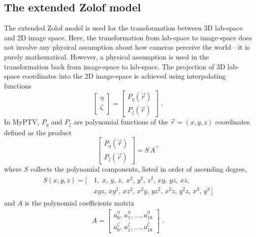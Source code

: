 \documentclass[10pt,a4paper]{article}
\begin{document}
\subsection{The extended Zolof model}
The extended Zolof model is used for the transformation between 3D lab-space and 2D image space.
Here, the transformation from lab-space to image-space does not involve any physical assumption about how cameras perceive the world---it is purely mathematical. However, a physical assumption is used in the transformation back from image-space to lab-space.
The projection of 3D lab-space coordinates into the 2D image-space is achieved using interpolating functions
%
\begin{equation}
	\left[
	\begin{matrix}
		\eta \\[.2cm]
		\zeta
	\end{matrix}
	\right]
	=
	\left[
	\begin{matrix}
		P_\eta(\vec{r}) \\[.2cm]
		P_\zeta(\vec{r})
	\end{matrix}
	\right]\,\, .
\end{equation}
%
In MyPTV, $P_\eta$ and $P_\zeta$ are polynomial functions of the $\vec{r}=(x,y,z)$ coordinates defined as the product
\begin{equation}
	\left[
	\begin{matrix}
		P_\eta(\vec{r}) \\[.2cm]
		P_\zeta(\vec{r})
	\end{matrix}
	\right] = S \, A^{\top}
\end{equation}
where $S$ collects the polynomial components, listed in order of ascending degree,
%
\begin{align}
	\label{eq:SoloffVector}
	\begin{split}
		S\left(x,y,z\right) = [\,&1,\;x,\,y,\,z,\;x^2,\,y^2,\,z^2,\,xy,\,yz,\,xz,\\
		&xyz,\,xy^2,\,xz^2,\,x^2y,\,yz^2,\,x^2z,\,y^2z,\,x^3,\,y^3\,]
	\end{split}
\end{align}
%
and $A$ is the polynomial coefficients matrix
%
\begin{align}
	\label{eq:SoloffVector2}
	A =
	\begin{bmatrix}
		a^\eta_{0},\, a^\eta_{1},\, \ldots , a^\eta_{18} \\[.2cm]
		a^\zeta_{0},\, a^\zeta_{1},\, \ldots , a^\zeta_{18}
	\end{bmatrix}\,\,.
\end{align}
\end{document}
